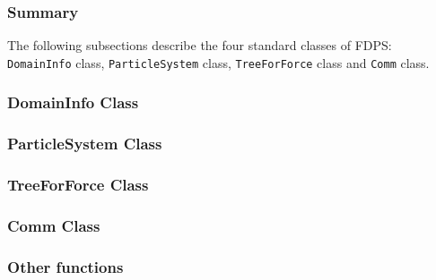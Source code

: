 \subsubsection{Summary}

The following subsections describe the four standard classes of FDPS:
{\tt DomainInfo} class, {\tt ParticleSystem} class, {\tt TreeForForce}
class and {\tt Comm} class.


\subsubsection{DomainInfo Class}



\subsubsection{ParticleSystem Class}



\subsubsection{TreeForForce Class}



\subsubsection{Comm Class}



\subsubsection{Other functions}



